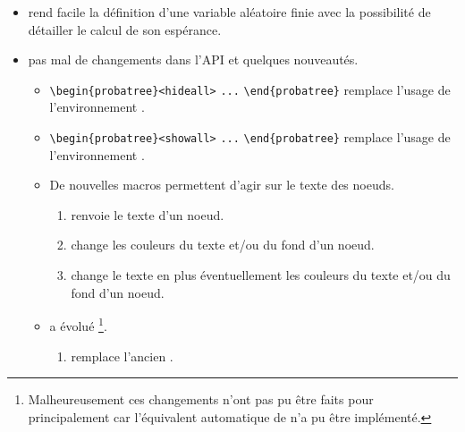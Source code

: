 \begin{itemize}[itemsep=.5em]
    \item {}
    	   rend facile la définition d'une variable aléatoire finie avec la possibilité de détailler le calcul de son espérance.




    \item {}
    	  pas mal de changements dans l'API et quelques nouveautés.

    \begin{itemize}[itemsep=.5em]
        \item \verb#\begin{probatree}<hideall># \verb#...# \verb#\end{probatree}#  remplace l'usage de l'environnement .


        \item \verb#\begin{probatree}<showall># \verb#...# \verb#\end{probatree}# remplace l'usage de l'environnement .


        \item De nouvelles macros permettent d'agir sur le texte des noeuds.

        \begin{enumerate}
        	\item {} renvoie le texte d'un noeud.

        	\item {} change les couleurs du texte et/ou du fond d'un noeud.

        	\item {} change le texte en plus éventuellement  les couleurs du texte et/ou du fond d'un noeud.
        \end{enumerate}


        \item {} a évolué
              \footnote{
              		Malheureusement ces changements n'ont pas pu être faits pour  principalement car l'équivalent automatique de  n'a pu être implémenté.
			  }.

        \begin{enumerate}
        	\item {} remplace l'ancien .


\end{enumerate}
\end{itemize}
\end{itemize}
